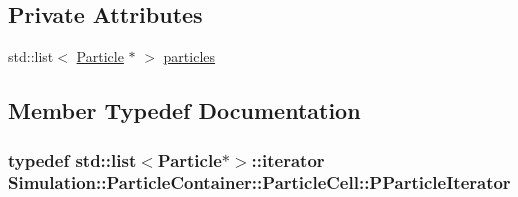 \subsection*{Private Attributes}
\begin{DoxyCompactItemize}
\item 
std\-::list$<$ \hyperlink{classSimulation_1_1Particle}{Particle} $\ast$ $>$ \hyperlink{classSimulation_1_1ParticleContainer_1_1ParticleCell_aadee3b53c58700f80e99db9e97849aff}{particles}
\end{DoxyCompactItemize}


\subsection{Member Typedef Documentation}
\hypertarget{classSimulation_1_1ParticleContainer_1_1ParticleCell_a7ed11e6bad14d516721e3d21adfa5da6}{
\subsubsection[{P\-Particle\-Iterator}]{\setlength{\rightskip}{0pt plus 5cm}typedef std\-::list$<${\bf Particle}$\ast$$>$\-::iterator {\bf Simulation\-::\-Particle\-Container\-::\-Particle\-Cell\-::\-P\-Particle\-Iterator}}}\label{classSimulation_1_1ParticleContainer_1_1ParticleCell_a7ed11e6bad14d516721e3d21adfa5da6}


